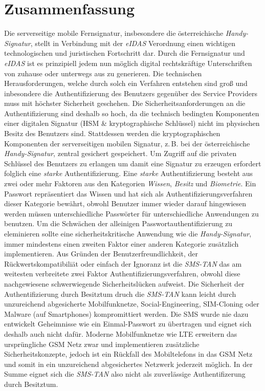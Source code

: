 \documentclass[11pt,a4paper,ngerman]{scrreprt}
\begin{document}
\chapter{Zusammenfassung}
Die serverseitige mobile Fernsignatur, insbesondere die österreichische \textit{Handy-Signatur}, stellt in Verbindung mit der \textit{eIDAS} Verordnung einen wichtigen technologischen und juristischen Fortschritt dar. Durch die Fernsignatur und \textit{eIDAS} ist es prinzipiell jedem nun möglich digital rechtskräftige Unterschriften von zuhause oder unterwegs aus zu generieren. Die technischen Herausforderungen, welche durch solch ein Verfahren entstehen sind groß und inbesondere die Authentifizierung des Benutzers gegenüber des Service Providers muss mit höchster Sicherheit geschehen. Die Sicherheitsanforderungen an die Authentifizierung sind deshalb so hoch, da die technisch bedingten Komponenten einer digitalen Signatur (HSM \& kryptographische Schlüssel) nicht im physischen Besitz des Benutzers sind. Stattdessen werden die kryptographischen Komponenten der serverseitigen mobilen Signatur, z.\,B. bei der österreichische \textit{Handy-Signatur}, zentral gesichert gespeichert. Um Zugriff auf die privaten Schlüssel des Benutzers zu erlangen um damit eine Signatur zu erzeugen erfordert folglich eine \textit{starke} Authentifizierung. Eine \textit{starke} Authentifizierung besteht aus zwei oder mehr Faktoren aus den Kategorien \emph{Wissen}, \emph{Besitz} und \emph{Biometrie}. Ein Passwort repräsentiert das Wissen und hat sich als Authentifizierungsverfahren dieser Kategorie bewährt, obwohl Benutzer immer wieder darauf hingewiesen werden müssen unterschiedliche Passwörter für unterschiedliche Anwendungen zu benutzen. Um die Schwächen der alleinigen Passwortauthentifizierung zu eleminieren sollte eine sicherheitskritische Anwendung wie die \textit{Handy-Signatur}, immer mindestens einen zweiten Faktor einer anderen Kategorie zusätzlich implementieren. Aus Gründen der Benutzerfreundlichkeit, der Rückwertskompatibiliät oder einfach der Ignoranz ist die \textit{SMS-TAN} das am weitesten verbreitete zwei Faktor Authentifizierungsverfahren, obwohl diese nachgewiesene schwerwiegende Sicherheitslücken aufweist. Die Sicherheit der Authentifizierung durch Besitztum druch die \textit{SMS-TAN} kann leicht durch unzureichend abgesicherte Mobilfunknetze, Social-Engineering, SIM-Cloning oder Malware (auf Smartphones) kompromittiert werden. Die SMS wurde nie dazu entwickelt Geheimnisse wie ein Einmal-Passwort zu übertragen und eignet sich deshalb auch nicht dafür. Moderne Mobilfunknetze wie LTE erweitern das ursprüngliche GSM Netz zwar und implementieren zusätzliche Sicherheitskonzepte, jedoch ist ein Rückfall des Mobiltelefons in das GSM Netz und somit in ein unzureichend abgesichertes Netzwerk jederzeit möglich. In der Summe eignet sich die \textit{SMS-TAN} also nicht als zuverlässige Authentifizerung durch Besitztum.
\end{document}
